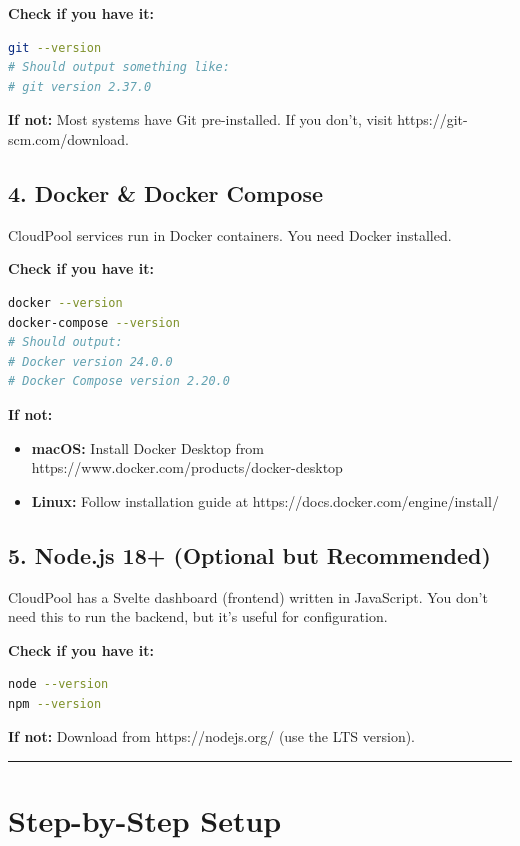 \documentclass[11pt,a4paper]{report}
\begin{document}
\textbf{Check if you have it:}
\begin{lstlisting}[language=bash]
git --version
# Should output something like:
# git version 2.37.0
\end{lstlisting}

\textbf{If not:} Most systems have Git pre-installed. If you don't, visit https://git-scm.com/download.


\section{4. Docker \& Docker Compose}


CloudPool services run in Docker containers. You need Docker installed.

\textbf{Check if you have it:}
\begin{lstlisting}[language=bash]
docker --version
docker-compose --version
# Should output:
# Docker version 24.0.0
# Docker Compose version 2.20.0
\end{lstlisting}

\textbf{If not:}
\begin{itemize}
\item \textbf{macOS:} Install Docker Desktop from https://www.docker.com/products/docker-desktop
\item \textbf{Linux:} Follow installation guide at https://docs.docker.com/engine/install/

\end{itemize}

\section{5. Node.js 18+ (Optional but Recommended)}


CloudPool has a Svelte dashboard (frontend) written in JavaScript. You don't need this to run the backend, but it's useful for configuration.

\textbf{Check if you have it:}
\begin{lstlisting}[language=bash]
node --version
npm --version
\end{lstlisting}

\textbf{If not:} Download from https://nodejs.org/ (use the LTS version).


\vfill\hrule\vfill



\chapter{Step-by-Step Setup}
\end{document}
